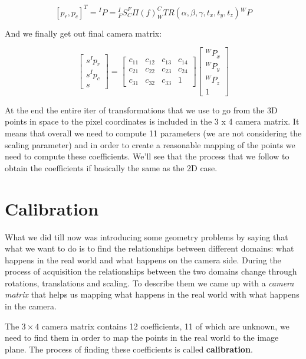 \[
  [p_r, p_c]^T = {}^IP = {}^I_F S^F_C \varPi (f)^C_W TR(\alpha, \beta, \gamma, t_x, t_y, t_z) {}^WP
\]

And we finally get out final camera matrix:

\[
    \begin{bmatrix}
        s^Ip_r \\
        s^Ip_c \\
        s
    \end{bmatrix}
    = 
    \begin{bmatrix}
        c_{11} & c_{12} & c_{13} & c_{14} \\
        c_{21} & c_{22} & c_{23} & c_{24} \\
        c_{31} & c_{32} & c_{33} & 1
    \end{bmatrix}
    \begin{bmatrix}
        {}^WP_x \\
        {}^WP_y \\
        {}^WP_z \\
        1
    \end{bmatrix}
\]

At the end the entire iter of transformations that we use to go from the 3D points in space to the pixel coordinates is included in the 3 x 4 camera matrix. It means that overall we need to compute 11 parameters (we are not considering the scaling parameter) and in order to create a reasonable mapping of the points we need to compute these coefficients. We'll see that the process that we follow to obtain the coefficients if basically the same as the 2D case.

\section{Calibration}

What we did till now was introducing some geometry problems by saying that what we want to do is to find the relationships between different domains: what happens in the real world and what happens on the camera side. During the process of acquisition the relationships between the two domains change through rotations, translations and scaling. To describe them we came up with a \textit{camera matrix} that helps us mapping what happens in the real world with what happens in the camera.

The \(3 \times 4\) camera matrix contains 12 coefficients, 11 of which are unknown, we need to find them in order to map the points in the real world to the image plane. The process of finding these coefficients is called \textbf{calibration}.

